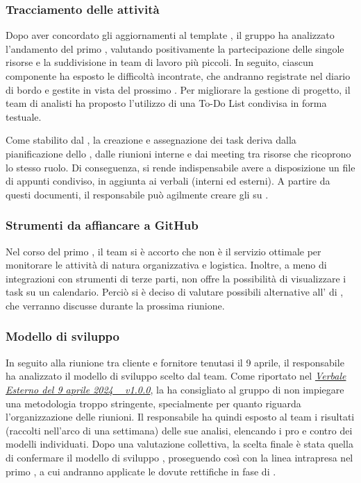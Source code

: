 \subsubsection{Tracciamento delle attività}
\par Dopo aver concordato gli aggiornamenti al template , il gruppo ha analizzato l'andamento del primo , valutando positivamente la partecipazione delle singole risorse e la suddivisione in team di lavoro più piccoli. In seguito, ciascun componente ha esposto le difficoltà incontrate, che andranno registrate nel diario di bordo e gestite in vista del prossimo . Per migliorare la gestione di progetto, il team di analisti ha proposto l’utilizzo di una To-Do List condivisa in forma testuale.
\par Come stabilito dal \glossario{\WoW}, la creazione e assegnazione dei task deriva dalla pianificazione dello , dalle riunioni interne e dai meeting tra risorse che ricoprono lo stesso ruolo. Di conseguenza, si rende indispensabile avere a disposizione un file di appunti condiviso, in aggiunta ai verbali (interni ed esterni). A partire da questi documenti, il responsabile può agilmente creare gli  su .

\subsubsection{Strumenti da affiancare a GitHub}
\par Nel corso del primo , il team si è accorto che  non è il servizio ottimale per monitorare le attività di natura organizzativa e logistica. Inoltre, a meno di integrazioni con strumenti di terze parti,  non offre la possibilità di visualizzare i task su un calendario. Perciò si è deciso di valutare possibili alternative all' di , che verranno discusse durante la prossima riunione.

\subsubsection{Modello di sviluppo}
\par In seguito alla riunione tra cliente e fornitore tenutasi il 9 aprile, il responsabile ha analizzato il modello di sviluppo scelto dal team. Come riportato nel \href{https://argo-swe.github.io/2 - RTB/Verbali/Esterni/VerbaleEsterno_2024-04-09.pdf}{\emph{Verbale Esterno del 9 aprile 2024 \  v1.0.0}}, la  ha consigliato al gruppo di non impiegare una metodologia troppo stringente, specialmente per quanto riguarda l'organizzazione delle riunioni. Il responsabile ha quindi esposto al team i risultati (raccolti nell'arco di una settimana) delle sue analisi, elencando i pro e contro dei modelli individuati. Dopo una valutazione collettiva, la scelta finale è stata quella di confermare il modello di sviluppo , proseguendo così con la linea intrapresa nel primo , a cui andranno applicate le dovute rettifiche in fase di .


